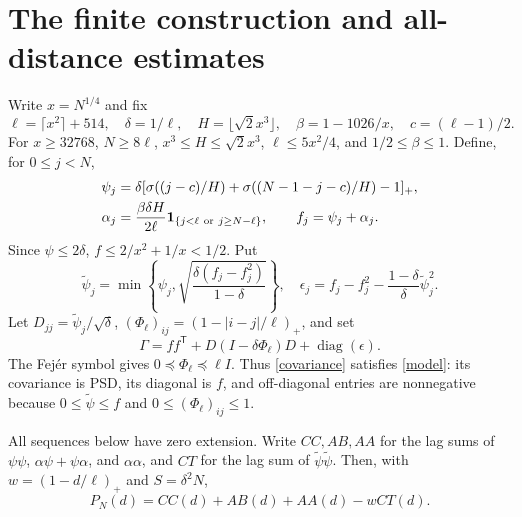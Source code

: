 \section{The finite construction and all-distance estimates}
Write \(x=N^{1/4}\) and fix
\begin{equation}
 \ell=\lceil x^2\rceil+514,\quad \delta=1/\ell,\quad
 H=\lfloor\sqrt2x^3\rfloor,\quad \beta=1-1026/x,
 \quad c=(\ell-1)/2. \label{params}
\end{equation}
For \(x\ge32768\), \(N\ge8\ell\), \(x^3\le H\le\sqrt2x^3\),
\(\ell\le5x^2/4\), and \(1/2\le\beta\le1\).
Define, for \(0\le j<N\),
\begin{align}
 \psi_j&=\delta[\sigma((j-c)/H)+\sigma((N-1-j-c)/H)-1]_+,\notag\\
 \alpha_j&=\frac{\beta\delta H}{2\ell}
 \mathbf1_{\{j<\ell\ \text{or}\ j\ge N-\ell\}},
 \qquad f_j=\psi_j+\alpha_j. \label{profile}
\end{align}
Since \(\psi\le2\delta\), \(f\le2/x^2+1/x<1/2\). Put
\[
 \widetilde\psi_j=\min\left\{\psi_j,
 \sqrt{\frac{\delta(f_j-f_j^2)}{1-\delta}}\right\},\quad
 \epsilon_j=f_j-f_j^2-\frac{1-\delta}{\delta}\widetilde\psi_j^2.
\]
Let \(D_{jj}=\widetilde\psi_j/\sqrt\delta\),
\((\Phi_\ell)_{ij}=(1-|i-j|/\ell)_+\), and set
\begin{equation}
 \Gamma=ff^{\mathsf T}+D(I-\delta\Phi_\ell)D+\operatorname{diag}(\epsilon).
 \label{covariance}
\end{equation}
The Fej\'er symbol gives \(0\preceq\Phi_\ell\preceq\ell I\).
Thus \eqref{covariance} satisfies \eqref{model}: its covariance is PSD,
its diagonal is \(f\), and off-diagonal entries are nonnegative because
\(0\le\widetilde\psi\le f\) and \(0\le(\Phi_\ell)_{ij}\le1\).

All sequences below have zero extension. Write \(CC,AB,AA\) for the lag
sums of \(\psi\psi\), \(\alpha\psi+\psi\alpha\), and \(\alpha\alpha\),
and \(CT\) for the lag sum of \(\widetilde\psi\widetilde\psi\).
Then, with \(w=(1-d/\ell)_+\) and \(S=\delta^2N\),
\begin{equation}
 P_N(d)=CC(d)+AB(d)+AA(d)-wCT(d). \label{pair}
\end{equation}

